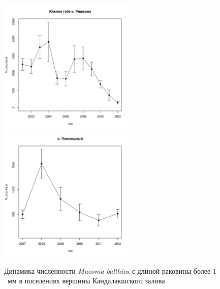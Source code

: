 \documentclass[12pt, a4paper]{article}
\begin{document}
\begin{figure}[h]

\begin{multicols}{2}
\hfill
\includegraphics[width=65mm]{../White_Sea/Ryashkov_YuG/N2_dynamic.pdf}
\hfill
\includegraphics[width=65mm]{../White_Sea/Lomnishniy/N2_dynamic.pdf}
\end{multicols}



\caption{Динамика численности {\it Macoma balthica} с длиной раковины более $1$~мм в поселениях вершины Кандалакшского залива}
\label{ris:dynamic_Kandalaksha_all}
\end{figure}
\end{document}

